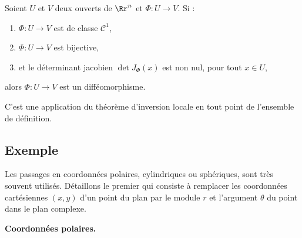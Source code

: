 \documentclass[11pt, class=report,crop=false]{standalone}
\begin{document}
\begin{theoreme}
Soient $U$ et $V$ deux ouverts de $\Rr^n$ et $\Phi:U\to V$.
Si :
\begin{enumerate}
     \item $\Phi:U\to V$ est de classe $\mathcal{C}^1$,
     \item $\Phi:U\to V$ est bijective,
     \item et le déterminant jacobien $\det J_\Phi(x)$ est non nul, pour tout $x \in U$, 
    \end{enumerate}
    alors $\Phi : U \to V$ est un difféomorphisme.
\end{theoreme}

C'est une application du théorème d'inversion locale en tout point de l'ensemble de définition.

\subsection{Exemple}



Les passages en coordonnées polaires, cylindriques ou sphériques, sont très souvent utilisés. Détaillons le premier qui consiste à remplacer les coordonnées cartésiennes $(x,y)$ d'un point du plan par le module $r$ et l'argument $\theta$ du point dans le plan complexe.

  
\textbf{Coordonnées polaires.}
\end{document}
